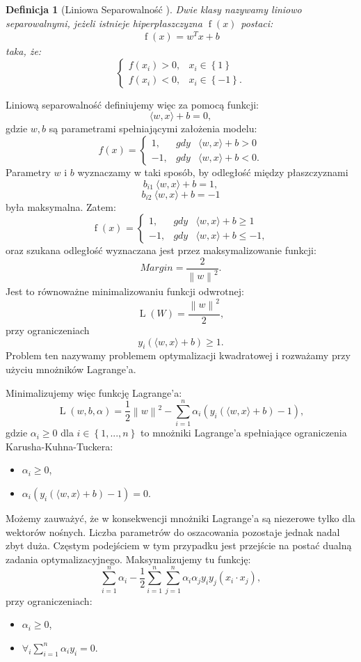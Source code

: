 \documentclass[12pt,a4paper]{report}
\newtheorem{df}{Definicja}[chapter]
\newcommand{\set}[1]{\left\lbrace {#1} \right\rbrace}
\newcommand{\norm}[2][]{\left\| {#2} \right\|_{#1}}
\newcommand{\f}[2][]{\operatorname{f}\left( {#2} \right)_{#1}}
\newcommand{\reciprocal}[1]{\operatorname{L}\left( {#1} \right)}
\begin{document}
\begin{df}[Liniowa Separowalność {\citep{svmmwn}}]
Dwie klasy nazywamy liniowo separowalnymi, jeżeli istnieje hiperpłaszczyzna $\f{x}$ postaci:
$$
\f{x} = w^T x +b
$$
taka, że:
$$
\left\{\begin{array}{ll}
f(x_i)>0, &    x_i\in\set{1} \\
f(x_i)<0, &    x_i\in\set{-1}.
\end{array} \right.
$$
\end{df}
Liniową separowalność definiujemy więc za pomocą funkcji:
$$
\langle w,x \rangle + b = 0,
$$
gdzie $w, b$ są parametrami spełniającymi założenia modelu:
$$
f(x) = 
\left\{\begin{array}{lll}
1, & gdy &   \langle w,x \rangle + b > 0 \\
-1, &   gdy &   \langle w,x \rangle + b < 0.
\end{array} \right.
$$
Parametry $w$ i $b$ wyznaczamy w taki sposób, by odległość między płaszczyznami
$$
b_{i1} \: \langle w,x \rangle + b = 1,
$$
$$
b_{i2} \: \langle w,x \rangle + b = -1
$$
była maksymalna.
Zatem:
$$
\f{x} = 
\left\{\begin{array}{lll}
1, & gdy &   \langle w,x \rangle + b \geq 1 \\
-1, &   gdy &   \langle w,x \rangle + b \leq -1,
\end{array} \right.
$$
oraz szukana odległość wyznaczana jest przez maksymalizowanie funkcji:
$$
Margin=\frac{2}{\norm{w}^2}.
$$
Jest to równoważne minimalizowaniu funkcji odwrotnej:
$$
\reciprocal{W} = \frac{\norm{w}^2}{2},
$$
przy ograniczeniach
$$
y_i(\langle w,x \rangle + b) \geq 1.
$$
Problem ten nazywamy problemem optymalizacji kwadratowej i rozważamy przy użyciu mnożników Lagrange'a. 

Minimalizujemy więc funkcję Lagrange'a:
$$
\reciprocal{w,b,\alpha}=\frac{1}{2}\norm{w}^2 - \sum_{i=1}^n \alpha_i(y_i(\langle w,x \rangle + b)-1),
$$
gdzie
$\alpha_i \geq 0$ dla $i \in \set{1,...,n}$ to mnożniki Lagrange'a spełniające ograniczenia Karusha-Kuhna-Tuckera:
\begin{itemize}
\item $\alpha_i \geq 0$,
\item $\alpha_i(y_i(\langle w,x \rangle + b)-1) = 0$.
\end{itemize}

Możemy zauważyć, że w konsekwencji mnożniki Lagrange'a są niezerowe tylko dla wektorów nośnych. Liczba parametrów do oszacowania pozostaje jednak nadal zbyt duża. Częstym podejściem w tym przypadku jest przejście na postać dualną zadania optymalizacyjnego.
Maksymalizujemy tu funkcję:
$$
\sum_{i=1}^n \alpha_i - \frac{1}{2} \sum_{i=1}^n \sum_{j=1}^{n} \alpha_i \alpha_j y_i y_j(x_i \cdot x_j),
$$
przy ograniczeniach:
\begin{itemize}
\item $\alpha_i \geq 0$,
\item $\forall_i \sum_{i=1}^n \alpha_i y_i =0$.
\end{itemize}
\end{document}
